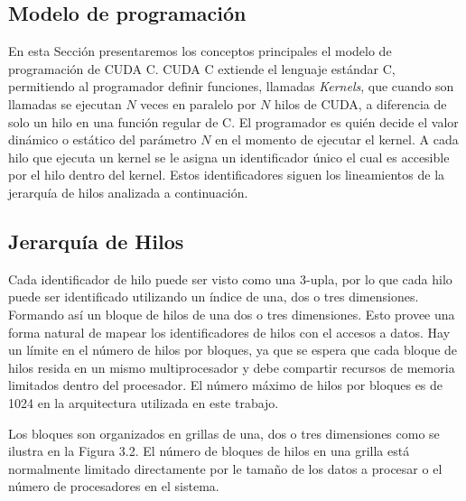 \documentclass[a4paper,openright,12pt, oneside]{book}
\begin{document}
\subsection{Modelo de programaci\'on}

En esta Secci\'on presentaremos los conceptos principales el modelo de programaci\'on
de CUDA C. CUDA C extiende el lenguaje est\'andar C, permitiendo al programador definir
funciones, llamadas \textit{Kernels}, que cuando son llamadas se ejecutan $N$ veces
en paralelo por $N$ hilos de CUDA, a diferencia de solo un hilo en una funci\'on regular
de C. El programador es qui\'en decide el valor din\'amico o est\'atico del par\'ametro $N$
en el momento de ejecutar el kernel. A cada hilo que ejecuta un kernel se le asigna
un identificador \'unico el cual es accesible por el hilo dentro del kernel. Estos identificadores
siguen los lineamientos de la jerarqu\'ia de hilos analizada a continuaci\'on.

\subsection*{Jerarqu\'ia de Hilos}

Cada identificador de hilo puede ser visto como una 3-upla, por lo que cada hilo
puede ser identificado utilizando un \'indice de una, dos o tres dimensiones. Formando as\'i
un bloque de hilos de una dos o tres dimensiones. Esto provee una forma natural de
mapear los identificadores de hilos con el accesos a datos. Hay un l\'imite en el 
n\'umero de hilos por bloques, ya que se espera que cada bloque de hilos resida en 
un mismo multiprocesador y debe compartir recursos de memoria limitados dentro
del procesador. El n\'umero m\'aximo de hilos por bloques es de 1024 en la arquitectura
utilizada en este trabajo.

Los bloques son organizados en grillas de una, dos o tres dimensiones como se ilustra
en la Figura 3.2. El n\'umero de bloques de hilos en una grilla est\'a normalmente
limitado directamente por le tama\~no de los datos a procesar o el n\'umero de procesadores
en el sistema.
\end{document}
